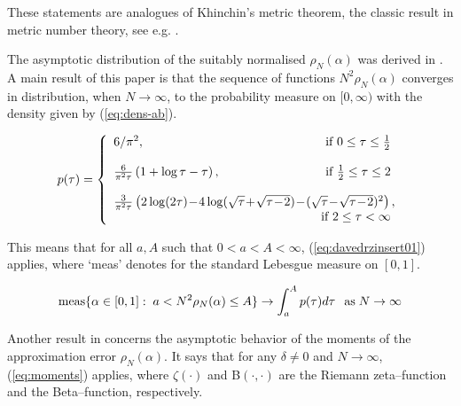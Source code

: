 \documentclass{esub2acm}
\begin{document}
These statements are analogues of Khinchin's metric theorem,
the classic result
in metric number theory, see e.g. \cite{Harman}.

The asymptotic distribution of the suitably normalised
$\rho_N(\alpha)$
was derived in  \cite{KargaevZ1}.  A main result of this
paper is that
the sequence of functions
$N^2\rho_N(\alpha)$ converges in distribution, when $N\rightarrow
\infty$,
to the probability measure on $[0, \infty)$ with the density given
by (\ref{eq:dens-ab}).

\begin{equation}
\label{eq:dens-ab}
{p}(\tau) =
\left\{\begin{array}{l}
                 6/\pi^2, \hfill\mbox{ if $0 \leq \tau \leq \frac{1}{2}$ }\\
                 \\
                 \frac{6}{\pi^2 \tau} \left(1 + \log \tau - \tau
               \right), \hfill\mbox{ if $\frac{1}{2}\leq \tau\leq 2 $ } \\
                 \\
               \frac{ 3}{\pi^2 \tau}\left(2\log(2 \tau)\!
               -\!4\log(\sqrt{\tau}\!+\!\sqrt{\tau\!-\!2})\!
               -\! (\sqrt{\tau}\!-\!\sqrt{\tau\!-\!2})^2 \right),
                             \\
                             \hfill \mbox{ if $2 \leq \tau < \infty  $ } \\
                  \end{array}
             \right.
\end{equation}

This means that
for all $a,A$
such that
 $0<a<A<\infty$,
(\ref{eq:davedrzinsert01}) applies,
where
{\rm `meas'} denotes for the standard Lebesgue measure on $[0,1]$.

\begin{equation}
\label{eq:davedrzinsert01}
{\rm meas}  \{ \alpha \in [0,1]: \;a < N^2 \rho_N(\alpha) \leq A \}
\rightarrow
\int_a^A {p}(\tau) d \tau\,
\;\;{\rm as}\; N \rightarrow \infty
\end{equation}

Another  result in \cite{KargaevZ1} concerns the asymptotic
behavior
of the moments of the approximation error $\rho_N(\alpha) $. It
says that
for any $\delta\neq 0$ and $N \rightarrow \infty$,
(\ref{eq:moments}) applies,
 where  $\zeta(\cdot)$ and B$(\cdot,\cdot)$
are the Riemann zeta--function and the Beta--function,
respectively.
\end{document}
